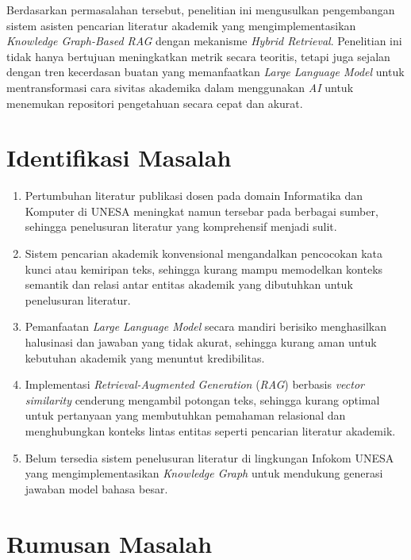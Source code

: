 Berdasarkan permasalahan tersebut, penelitian ini mengusulkan pengembangan sistem asisten pencarian literatur akademik yang mengimplementasikan \textit{Knowledge Graph-Based RAG} dengan mekanisme \textit{Hybrid Retrieval}. Penelitian ini tidak hanya bertujuan meningkatkan metrik secara teoritis, tetapi juga sejalan dengan tren kecerdasan buatan yang memanfaatkan \textit{Large Language Model} untuk mentransformasi cara sivitas akademika dalam menggunakan \textit{AI} untuk menemukan repositori pengetahuan secara cepat dan akurat.

\section{Identifikasi Masalah}

\begin{enumerate}[label=\arabic*., leftmargin=0.75cm]
    \item Pertumbuhan literatur publikasi dosen pada domain Informatika dan Komputer di UNESA meningkat namun tersebar pada berbagai sumber, sehingga penelusuran literatur yang komprehensif menjadi sulit.

    \item Sistem pencarian akademik konvensional mengandalkan pencocokan kata kunci atau kemiripan teks, sehingga kurang mampu memodelkan konteks semantik dan relasi antar entitas akademik yang dibutuhkan untuk penelusuran literatur.

    \item Pemanfaatan \textit{Large Language Model} secara mandiri berisiko menghasilkan halusinasi dan jawaban yang tidak akurat, sehingga kurang aman untuk kebutuhan akademik yang menuntut kredibilitas.

    \item Implementasi \textit{Retrieval-Augmented Generation} (\textit{RAG}) berbasis \textit{vector similarity} cenderung mengambil potongan teks, sehingga kurang optimal untuk pertanyaan yang membutuhkan pemahaman relasional dan menghubungkan konteks lintas entitas seperti pencarian literatur akademik.

    \item Belum tersedia sistem penelusuran literatur di lingkungan Infokom UNESA yang mengimplementasikan \textit{Knowledge Graph} untuk mendukung generasi jawaban model bahasa besar.
\end{enumerate}

\section{Rumusan Masalah}

